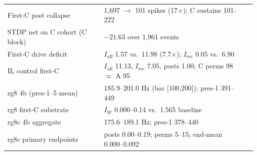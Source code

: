 \begin{table}[t]
\begin{tabular}{p{6.2cm}p{6.2cm}l}
First-C post collapse & 1{,}697 \(\to\) 101 spikes (17\(\times\)); C sustains 101--222 & \cite{wgrowth} \\
STDP net on C cohort (C block) & \(-21.63\) over 1{,}961 events & \cite{wgrowth} \\
First-C drive deficit & \(I_{\mathrm{aff}}\) 1.57 vs.\ 11.98 (7.7\(\times\)); \(I_{\mathrm{rec}}\) 0.05 vs.\ 6.90 & \cite{drive} \\
IL control first-C & \(I_{\mathrm{aff}}\) 11.13, \(I_{\mathrm{rec}}\) 7.05, posts 1.00; C perms 98 \(\approx\) A 95 & \cite{drive} \\
rg8 4b (pres-1--5 mean) & 185.9--201.0 Hz (bar [100,200]); pres-1 391--449 & \cite{rg8} \\
rg8 first-C substrate & \(I_W\) 0.000--0.14 vs.\ 1.565 baseline & \cite{rg8} \\
rg8c 4b aggregate & 175.6--189.1 Hz; pres-1 378--440 & \cite{rg8c} \\
rg8c primary endpoints & posts 0.00--0.19; perms 5--15; end-mean 0.000--0.092 & \cite{rg8c} \\
\bottomrule
\end{tabular}
\end{table}
